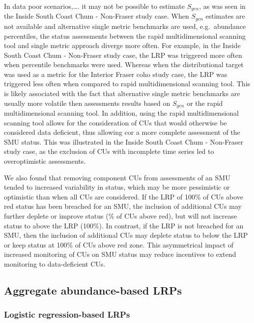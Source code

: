 \documentclass[11pt]{book}
\begin{document}
In data poor scenarios,\ldots. it may not be possible to estimate \(S_{gen}\), as was seen in the Inside South Coast Chum - Non-Fraser study case. When \(S_{gen}\) estimates are not available and alternative single metric benchmarks are used, e.g.~abundance percentiles, the status assessments between the rapid multidimensional scanning tool and single metric approach diverge more often. For example, in the Inside South Coast Chum - Non-Fraser study case, the LRP was triggered more often when percentile benchmarks were used. Whereas when the distributional target was used as a metric for the Interior Fraser coho study case, the LRP was triggered less often when compared to rapid multidimensional scanning tool. This is likely associated with the fact that alternative single metric benchmarks are usually more volatile then assessments results based on \(S_{gen}\) or the rapid multidimensional scanning tool. In addition, using the rapid multidimensional scanning tool allows for the consideration of CUs that would otherwise be considered data deficient, thus allowing cor a more complete assessment of the SMU status. This was illustrated in the Inside South Coast Chum - Non-Fraser study case, as the exclusion of CUs with incomplete time series led to overoptimistic assessments.

We also found that removing component CUs from assessments of an SMU tended to increased variability in status, which may be more pessimistic or optimistic than when all CUs are considered. If the LRP of 100\% of CUs above red status has been breached for an SMU, the inclusion of additional CUs may further deplete or improve status (\% of CUs above red), but will not increase status to above the LRP (100\%). In contrast, if the LRP is not breached for an SMU, then the inclusion of additional CUs may deplete status to below the LRP or keep status at 100\% of CUs above red zone. This asymmetrical impact of increased monitoring of CUs on SMU status may reduce incentives to extend monitoring to data-deficient CUs.

\hypertarget{aggregate-abundance-based-lrps}{%
\subsection{Aggregate abundance-based LRPs}\label{aggregate-abundance-based-lrps}}

\hypertarget{logistic-regression-based-lrps}{%
\subsubsection{Logistic regression-based LRPs}\label{logistic-regression-based-lrps}}
\end{document}
